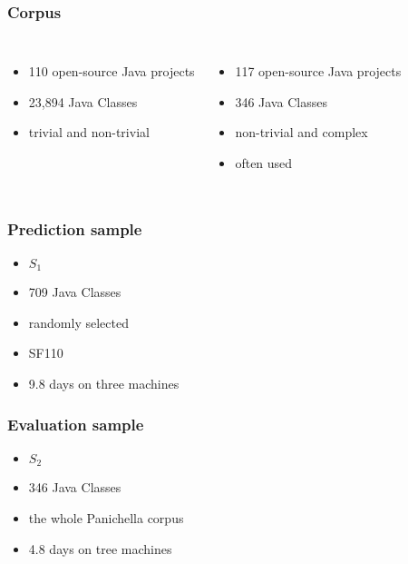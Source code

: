 \begin{frame}
	\frametitle{Corpus}
	
	\begin{columns}[c]
		
		\begin{itemize}
			\item 110 open-source Java projects
			\item 23,894 Java Classes
			\item trivial and non-trivial
		\end{itemize}
		
		\begin{itemize}
			\item 117 open-source Java projects
			\item 346 Java Classes
			\item non-trivial and complex
			\item often used
		\end{itemize}

	\end{columns}
	
\end{frame}

\begin{frame}
	\frametitle{Prediction sample}
	
	\begin{itemize}
		\item $S_1$
		\item 709 Java Classes
		\item randomly selected
		\item SF110
		\item 9.8 days on three machines
	\end{itemize}
	
\end{frame}

\begin{frame}
	\frametitle{Evaluation sample}
	
	\begin{itemize}
		\item $S_2$
		\item 346 Java Classes
		\item the whole Panichella corpus
		\item 4.8 days on tree machines
	\end{itemize}
	
\end{frame}

